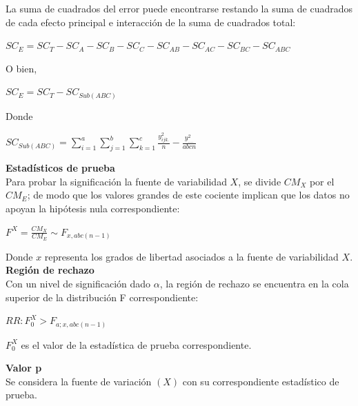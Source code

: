 La suma de cuadrados del error puede encontrarse restando la suma de cuadrados de cada efecto principal e interacción de la suma de cuadrados total:\\

\begin{center}
	$ SC_{E} = SC_{T} -SC_{A} - SC_{B}-SC_{C} -SC_{AB} -SC_{AC} -SC_{BC} -SC_{ABC} $\\
\end{center}

O bien,
\begin{center}
	$ SC_{E} = SC_{T} - SC_{Sub(ABC)} $\\
\end{center}

Donde
\begin{center}
	$ SC_{Sub(ABC)} = \sum_{i=1}^{a}  \sum_{j=1}^{b}  \sum_{k=1}^{c} \frac{y_{ijk.}^{2}}{n} - \frac{y_{....}^{2}}{abcn}  $\\
\end{center}


\textbf{Estadísticos de prueba}\\
Para probar la significación la fuente de variabilidad $X$, se divide $CM_{X}$ por el  $CM_{E}$; de modo que los valores grandes de este cociente implican que los datos no apoyan la hipótesis nula correspondiente:
\begin{center}
	$ F^{X} = \frac{CM_{X}}{CM_{E}} \sim F_{x,abc(n-1)}  $\\
\end{center}


Donde $x$ representa los grados de libertad asociados a la fuente de variabilidad $X$.\\

\textbf{Región de rechazo}\\

Con un nivel de significación dado $\alpha$, la región de rechazo se encuentra en la cola superior de la distribución F correspondiente:

\begin{center}
	$ RR : F_{0}^{X} > F_{a;x,abc(n-1)} $\\
\end{center}

$ F_{0}^{X} $ es el valor de la estadística de prueba correspondiente.

\textbf{Valor p}\\

Se considera la fuente de variación $(X)$ con su correspondiente estadístico de prueba.

